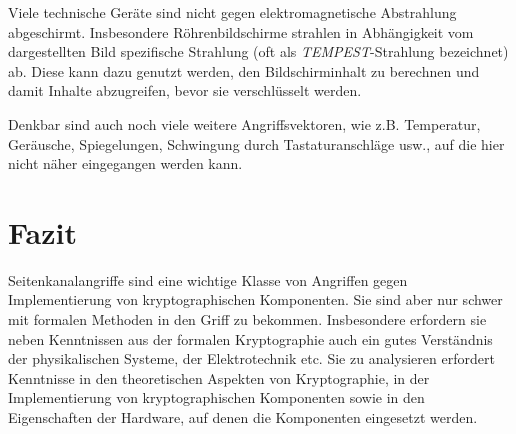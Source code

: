 Viele technische Geräte sind nicht gegen elektromagnetische Abstrahlung
abgeschirmt. Insbesondere Röhrenbildschirme strahlen in Abhängigkeit vom
dargestellten Bild spezifische Strahlung (oft als
\emph{TEMPEST}-Strahlung bezeichnet) ab. Diese kann dazu genutzt werden,
den Bildschirminhalt zu berechnen und damit Inhalte abzugreifen, bevor
sie verschlüsselt werden.

Denkbar sind auch noch viele weitere Angriffsvektoren, wie
z.B. Temperatur, Geräusche, Spiegelungen, Schwingung durch Tastaturanschläge usw.,
auf die hier nicht näher eingegangen werden kann. 


\section{Fazit}
Seitenkanalangriffe sind eine wichtige Klasse von Angriffen gegen
Implementierung von kryptographischen Komponenten. Sie sind aber nur
schwer mit formalen Methoden in den Griff zu bekommen. Insbesondere
erfordern sie neben Kenntnissen aus der formalen Kryptographie auch ein
gutes Verständnis der physikalischen Systeme, der Elektrotechnik etc.
Sie zu analysieren erfordert Kenntnisse in den theoretischen Aspekten
von Kryptographie, in der Implementierung von kryptographischen
Komponenten sowie in den Eigenschaften der Hardware, auf denen die
Komponenten eingesetzt werden.